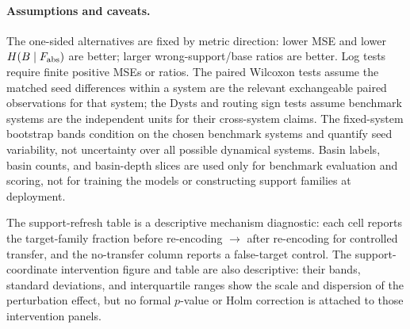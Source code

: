 \paragraph{Assumptions and caveats.}
The one-sided alternatives are fixed by metric direction: lower MSE and lower \(H(B\mid F_{\rm abs})\) are better; larger wrong-support/base ratios are better. Log tests require finite positive MSEs or ratios. The paired Wilcoxon tests assume the matched seed differences within a system are the relevant exchangeable paired observations for that system; the Dysts and routing sign tests assume benchmark systems are the independent units for their cross-system claims. The fixed-system bootstrap bands condition on the chosen benchmark systems and quantify seed variability, not uncertainty over all possible dynamical systems. Basin labels, basin counts, and basin-depth slices are used only for benchmark evaluation and scoring, not for training the models or constructing support families at deployment.

The support-refresh table is a descriptive mechanism diagnostic: each cell reports the target-family fraction before re-encoding \(\to\) after re-encoding for controlled transfer, and the no-transfer column reports a false-target control. The support-coordinate intervention figure and table are also descriptive: their bands, standard deviations, and interquartile ranges show the scale and dispersion of the perturbation effect, but no formal \(p\)-value or Holm correction is attached to those intervention panels.
